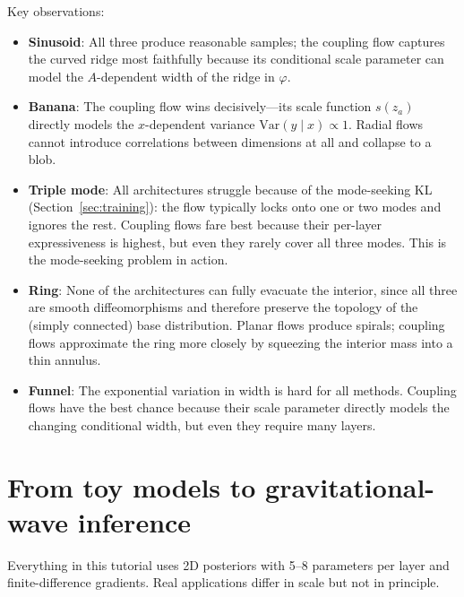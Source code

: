\documentclass[11pt,letterpaper]{article}
\begin{document}
Key observations:
\begin{itemize}
  \item \textbf{Sinusoid}: All three produce reasonable samples;
        the coupling flow captures the curved ridge most faithfully
        because its conditional scale parameter can model the
        $A$-dependent width of the ridge in $\varphi$.
  \item \textbf{Banana}: The coupling flow wins decisively---its
        scale function $s(z_a)$ directly models the $x$-dependent
        variance $\mathrm{Var}(y \mid x) \propto 1$.
        Radial flows cannot introduce correlations between dimensions
        at all and collapse to a blob.
  \item \textbf{Triple mode}: All architectures struggle because of
        the mode-seeking KL (Section~\ref{sec:training}): the flow
        typically locks onto one or two modes and ignores the rest.
        Coupling flows fare best because their per-layer expressiveness
        is highest, but even they rarely cover all three modes.
        This is the mode-seeking problem in action.
  \item \textbf{Ring}: None of the architectures can fully evacuate
        the interior, since all three are smooth diffeomorphisms
        and therefore preserve the topology of the (simply connected)
        base distribution.
        Planar flows produce spirals; coupling flows approximate the
        ring more closely by squeezing the interior mass into a thin
        annulus.
  \item \textbf{Funnel}: The exponential variation in width is hard
        for all methods.
        Coupling flows have the best chance because their scale
        parameter directly models the changing conditional width, but
        even they require many layers.
\end{itemize}


\section{From toy models to gravitational-wave inference}
\label{sec:gw}

Everything in this tutorial uses 2D posteriors with 5--8 parameters
per layer and finite-difference gradients.
Real applications differ in scale but not in principle.
\end{document}

